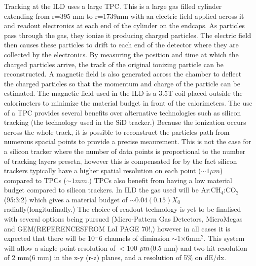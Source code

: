 Tracking at the \ac{ILD} uses a large \ac{TPC}. This is a large gas filled cylinder extending from r=395 mm to r=1739mm with an electric field applied across it and readout electronics at each end of the cylinder on the endcaps. As particles pass through the gas, they ionize it producing charged particles. The electric field then causes these particles to drift to each end of the detector where they are collected by the electronics. By measuring the position and time at which the charged particles arrive, the track of the original ionizing particle can be reconstructed. A magnetic field is also generated across the chamber to deflect the charged particles so that the momentum and charge of the particle can be estimated. The magnetic field used in the ILD is a 3.5T coil placed outside the calorimeters to minimize the material budget in front of the calorimeters. The use of a \ac{TPC} provides several benefits over alternative technologies such as silicon tracking (the technology used in the \ac{SiD} tracker.) Because the ionization occurs across the whole track, it is possible to reconstruct the particles path from numerous spacial points to provide a precise meaurement. This is not the case for a silicon tracker where the number of data points is proportional to the number of tracking layers presetn, however this is compensated for by the fact silicon trackers typically have a higher spatial resolution on each point ($\sim 1 \mu m$) compared to TPCs ($\sim 1 mm$.) TPCs also benefit from having a low material budget compared to silicon trackers. In \ac{ILD} the gas used will be Ar:CH$_{4}$:CO$_{2}$ (95:3:2) which gives a material budget of $\sim 0.04(0.15)X_0$ radially(longitudinally.) The choice of readout technology is yet to be finalised with several options being pursued (Micro-Pattern Gas Detectors, MicroMegas and GEM(REFERENCESFROM LoI PAGE 70!,) however in all cases it is expected that there will be 10${^-6}$ channels of diminsion $\sim$1$\times$6mm$^{2}$. This system will allow a single point resolution of $<$100$~\mu\textrm{m}$(0.5 mm) and two hit resolution of 2 mm(6 mm)  in the x-y (r-z) planes, and a resolution of 5$\%$ on dE/dx.





